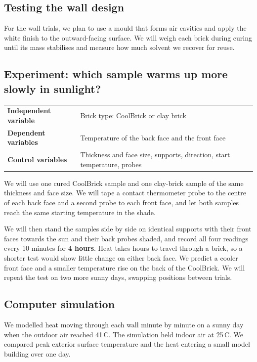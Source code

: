 \documentclass[11pt,a4paper]{article}
\begin{document}
\subsection{Testing the wall design}
For the wall trials, we plan to use a mould that forms air cavities and apply
the white finish to the outward-facing surface. We will weigh each brick
during curing until its mass stabilises and measure how much solvent we
recover for reuse.

\subsection{Experiment: which sample warms up more slowly in sunlight?}
\begin{center}
\begin{tabularx}{\textwidth}{@{}>{\bfseries}p{4.3cm}X@{}}
\toprule
Independent variable & Brick type: CoolBrick or clay brick \\
Dependent variables & Temperature of the back face and the front face \\
Control variables & Thickness and face size, supports, direction, start temperature, probes \\
\bottomrule
\end{tabularx}
\end{center}
We will use one cured CoolBrick sample and one clay-brick sample of the same
thickness and face size. We will tape a contact thermometer probe to the
centre of each back face and a second probe to each front face, and let both
samples reach the same starting temperature in the shade.

We will then stand the samples side by side on identical supports with their
front faces towards the sun and their back probes shaded, and record all four
readings every 10 minutes for \textbf{4 hours}. Heat takes hours to travel
through a brick, so a shorter test would show little change on either back
face. We predict a cooler front face and a smaller temperature rise on the
back of the CoolBrick. We will repeat the test on two more sunny days,
swapping positions between trials.

\subsection{Computer simulation}
We modelled heat moving through each wall minute by minute on a sunny day when
the outdoor air reached 41\,\textdegree C. The simulation held indoor air at 25\,\textdegree C. We
compared peak exterior surface temperature and the heat entering a small model
building over one day.
\end{document}
